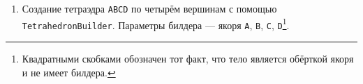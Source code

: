 \documentclass[fontsize=10px, a4paper, openany]{scrbook}
\begin{document}
\begin{enumerate}
\begin{center}
\end{center}

\pagebreak

\item Создание тетраэдра \texttt{ABCD} по четырём вершинам с помощью \texttt{TetrahedronBuilder}. Параметры билдера --- якоря \texttt{A}, \texttt{B}, \texttt{C}, \texttt{D}\footnote{Квадратными скобками обозначен тот факт, что тело является обёрткой якоря и не имеет билдера.}.


\end{enumerate}
\end{document}
